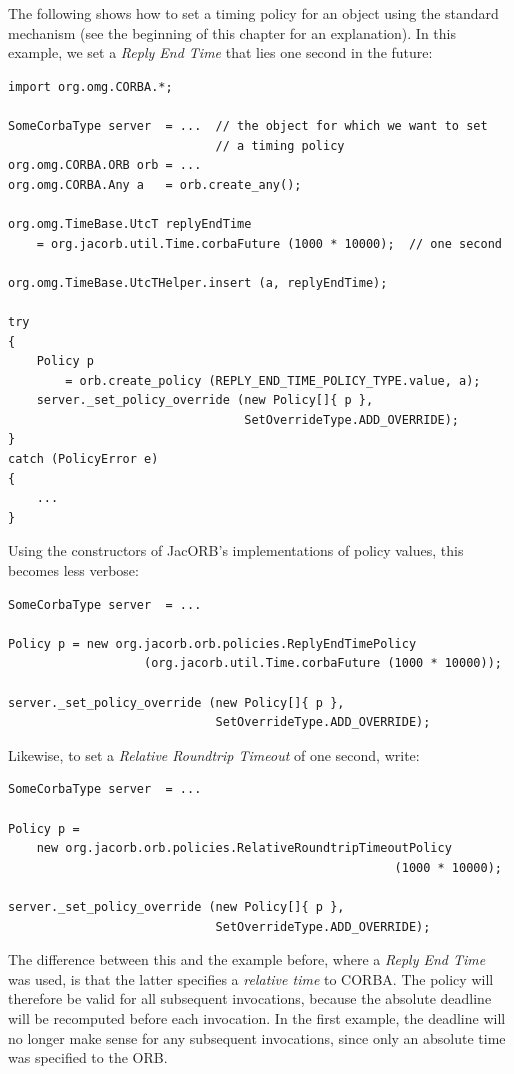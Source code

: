 The following shows how to set a timing policy for an object using the
standard mechanism (see the beginning of this chapter for an
explanation).  In this example, we set a \emph{Reply End Time} that
lies one second in the future:

\begin{verbatim}
import org.omg.CORBA.*;

SomeCorbaType server  = ...  // the object for which we want to set
                             // a timing policy
org.omg.CORBA.ORB orb = ...
org.omg.CORBA.Any a   = orb.create_any();

org.omg.TimeBase.UtcT replyEndTime
    = org.jacorb.util.Time.corbaFuture (1000 * 10000);  // one second

org.omg.TimeBase.UtcTHelper.insert (a, replyEndTime);

try
{
    Policy p
        = orb.create_policy (REPLY_END_TIME_POLICY_TYPE.value, a);
    server._set_policy_override (new Policy[]{ p },
                                 SetOverrideType.ADD_OVERRIDE);
}
catch (PolicyError e)
{
    ...
}
\end{verbatim}

\clearpage{}

Using the constructors of JacORB's implementations of policy values,
this becomes less verbose:

\begin{verbatim}
SomeCorbaType server  = ...

Policy p = new org.jacorb.orb.policies.ReplyEndTimePolicy
                   (org.jacorb.util.Time.corbaFuture (1000 * 10000));

server._set_policy_override (new Policy[]{ p },
                             SetOverrideType.ADD_OVERRIDE);
\end{verbatim}

Likewise, to set a \emph{Relative Roundtrip Timeout} of one second,
write:

\begin{verbatim}
SomeCorbaType server  = ...

Policy p =
    new org.jacorb.orb.policies.RelativeRoundtripTimeoutPolicy 
                                                      (1000 * 10000);

server._set_policy_override (new Policy[]{ p },
                             SetOverrideType.ADD_OVERRIDE);
\end{verbatim}

The difference between this and the example before, where a
\emph{Reply End Time} was used, is that the latter specifies a
\emph{relative time} to CORBA.  The policy will therefore be valid
for all subsequent invocations, because the absolute deadline will be
recomputed before each invocation.  In the first example, the
deadline will no longer make sense for any subsequent invocations,
since only an absolute time was specified to the ORB.



